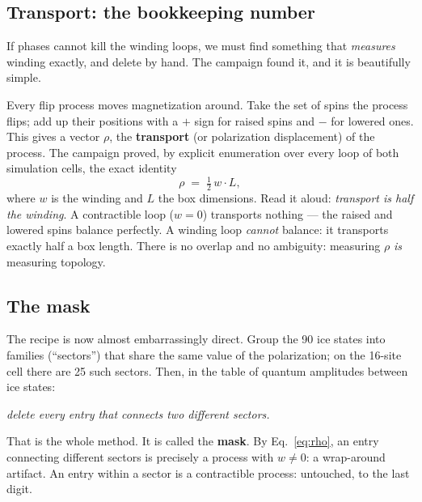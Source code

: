 \documentclass[11pt,a4paper]{article}
\begin{document}
\subsection{Transport: the bookkeeping number}

If phases cannot kill the winding loops, we must find something that
\emph{measures} winding exactly, and delete by hand.  The campaign found it,
and it is beautifully simple.

Every flip process moves magnetization around.  Take the set of spins the
process flips; add up their positions with a $+$ sign for raised spins and
$-$ for lowered ones.  This gives a vector $\rho$, the \textbf{transport} (or
polarization displacement) of the process.  The campaign proved, by explicit
enumeration over every loop of both simulation cells, the exact identity
\begin{equation}
\rho \;=\; \tfrac12\, w \cdot L,
\label{eq:rho}
\end{equation}
where $w$ is the winding and $L$ the box dimensions.  Read it aloud:
\emph{transport is half the winding}.  A contractible loop ($w=0$) transports
nothing --- the raised and lowered spins balance perfectly.  A winding loop
\emph{cannot} balance: it transports exactly half a box length.  There is no
overlap and no ambiguity: measuring $\rho$ \emph{is} measuring topology.

\subsection{The mask}

The recipe is now almost embarrassingly direct.  Group the 90 ice states into
families (``sectors'') that share the same value of the polarization; on the
16-site cell there are 25 such sectors.  Then, in the table of quantum
amplitudes between ice states:
\begin{center}
\emph{delete every entry that connects two different sectors.}
\end{center}
That is the whole method.  It is called the \textbf{mask}.  By
Eq.~\eqref{eq:rho}, an entry connecting different sectors is precisely a
process with $w\ne0$: a wrap-around artifact.  An entry within a sector is a
contractible process: untouched, to the last digit.
\end{document}
